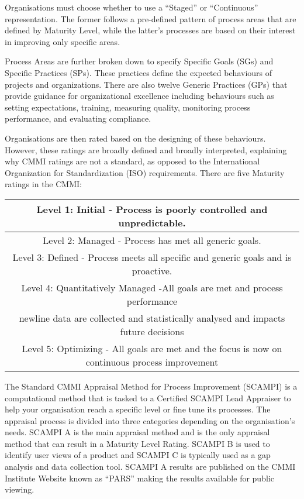 \documentclass{article}
\begin{document}
Organisations must choose whether to use a ``Staged'' or ``Continuous'' representation. The former follows a pre-defined pattern of process areas that are defined by Maturity Level, while the latter’s processes are based on their interest in improving only specific areas. \newline

Process Areas are further broken down to specify Specific Goals (SGs) and Specific Practices (SPs). These practices define the expected behaviours of projects and organizations. There are also twelve Generic Practices (GPs) that provide guidance for organizational excellence including behaviours such as setting expectations, training, measuring quality, monitoring process performance, and evaluating compliance. \cite{cmmi} \newline

Organisations are then rated based on the designing of these behaviours. However, these ratings are broadly defined and broadly interpreted, explaining why CMMI ratings are not a standard, as opposed to the International Organization for Standardization (ISO) requirements. There are five Maturity ratings in the CMMI:

\begin{center}
\begin{tabular}{||c||} 
\hline
Level 1: Initial - Process is poorly controlled and unpredictable.\\ 
\hline
Level 2: Managed - Process has met all generic goals. \\ 
\hline
Level 3: Defined - Process meets all specific and generic goals and is proactive. \\
\hline
Level 4: Quantitatively Managed -All goals are met and process performance\\newline data are collected and statistically analysed and impacts future decisions \\
\hline
Level 5: Optimizing - All goals are met and the focus is now on continuous process improvement \\
\hline
\end{tabular}
\end{center}

The Standard CMMI Appraisal Method for Process Improvement (SCAMPI) is a computational method that is tasked to a Certified SCAMPI Lead Appraiser to help your organisation reach a specific level or fine tune its processes. The appraisal process is divided into three categories depending on the organisation's needs. SCAMPI A is the main appraisal method and is the only appraisal method that can result in a Maturity Level Rating. SCAMPI B is used to identify user views of a product and SCAMPI C is typically used as a gap analysis and data collection tool. SCAMPI A results are published on the CMMI Institute Website known as “PARS” making the results available for public viewing. \cite{cmmi} \newline
\end{document}
